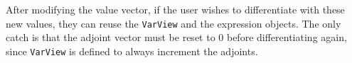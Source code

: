 After modifying the value vector, if the user wishes to differentiate with these new values,
they can reuse the \verb|VarView| and the expression objects.
The only catch is that the adjoint vector must be reset to 0 before differentiating again,
since \verb|VarView| is defined to always increment the adjoints.
